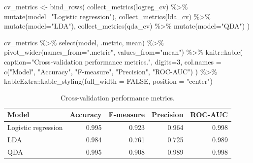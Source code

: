 \documentclass[
]{article}
\newenvironment{Shaded}{\begin{snugshade}}{\end{snugshade}}
\newcommand{\AttributeTok}[1]{\textcolor[rgb]{0.77,0.63,0.00}{#1}}
\newcommand{\ConstantTok}[1]{\textcolor[rgb]{0.00,0.00,0.00}{#1}}
\newcommand{\DecValTok}[1]{\textcolor[rgb]{0.00,0.00,0.81}{#1}}
\newcommand{\FunctionTok}[1]{\textcolor[rgb]{0.00,0.00,0.00}{#1}}
\newcommand{\NormalTok}[1]{#1}
\newcommand{\OtherTok}[1]{\textcolor[rgb]{0.56,0.35,0.01}{#1}}
\newcommand{\SpecialCharTok}[1]{\textcolor[rgb]{0.00,0.00,0.00}{#1}}
\newcommand{\StringTok}[1]{\textcolor[rgb]{0.31,0.60,0.02}{#1}}
\begin{document}
\begin{Shaded}
\begin{Highlighting}[]
\NormalTok{cv\_metrics }\OtherTok{\textless{}{-}} \FunctionTok{bind\_rows}\NormalTok{(}
    \FunctionTok{collect\_metrics}\NormalTok{(logreg\_cv) }\SpecialCharTok{\%\textgreater{}\%}
        \FunctionTok{mutate}\NormalTok{(}\AttributeTok{model=}\StringTok{"Logistic regression"}\NormalTok{),}
    \FunctionTok{collect\_metrics}\NormalTok{(lda\_cv) }\SpecialCharTok{\%\textgreater{}\%}
        \FunctionTok{mutate}\NormalTok{(}\AttributeTok{model=}\StringTok{"LDA"}\NormalTok{),}
    \FunctionTok{collect\_metrics}\NormalTok{(qda\_cv) }\SpecialCharTok{\%\textgreater{}\%}
        \FunctionTok{mutate}\NormalTok{(}\AttributeTok{model=}\StringTok{"QDA"}\NormalTok{)}
\NormalTok{)}

\NormalTok{cv\_metrics }\SpecialCharTok{\%\textgreater{}\%}
    \FunctionTok{select}\NormalTok{(model, .metric, mean) }\SpecialCharTok{\%\textgreater{}\%}
    \FunctionTok{pivot\_wider}\NormalTok{(}\AttributeTok{names\_from=}\StringTok{".metric"}\NormalTok{, }\AttributeTok{values\_from=}\StringTok{"mean"}\NormalTok{) }\SpecialCharTok{\%\textgreater{}\%}
\NormalTok{    knitr}\SpecialCharTok{::}\FunctionTok{kable}\NormalTok{(}
      \AttributeTok{caption=}\StringTok{"Cross{-}validation performance metrics."}\NormalTok{, }
      \AttributeTok{digits=}\DecValTok{3}\NormalTok{,}
      \AttributeTok{col.names =} \FunctionTok{c}\NormalTok{(}\StringTok{"Model"}\NormalTok{, }\StringTok{"Accuracy"}\NormalTok{, }\StringTok{"F{-}measure"}\NormalTok{, }\StringTok{"Precision"}\NormalTok{, }\StringTok{"ROC{-}AUC"}\NormalTok{)}
\NormalTok{  ) }\SpecialCharTok{\%\textgreater{}\%}
\NormalTok{  kableExtra}\SpecialCharTok{::}\FunctionTok{kable\_styling}\NormalTok{(}\AttributeTok{full\_width =} \ConstantTok{FALSE}\NormalTok{, }\AttributeTok{position =} \StringTok{"center"}\NormalTok{)}
\end{Highlighting}
\end{Shaded}

\begin{longtable}[t]{lrrrr}
\caption{\label{tab:cv metrics}Cross-validation performance metrics.}\\
\toprule
Model & Accuracy & F-measure & Precision & ROC-AUC\\
\midrule
Logistic regression & 0.995 & 0.923 & 0.964 & 0.998\\
LDA & 0.984 & 0.761 & 0.725 & 0.989\\
QDA & 0.995 & 0.908 & 0.989 & 0.998\\
\bottomrule
\end{longtable}
\end{document}
